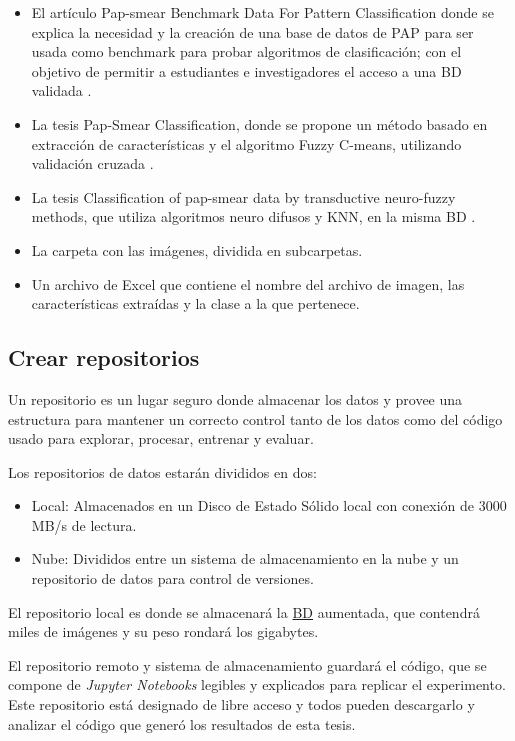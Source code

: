 \begin{itemize}
    \item El artículo Pap-smear Benchmark Data For Pattern Classification donde se explica
    la necesidad y la creación de una base de datos de PAP para ser usada como benchmark
    para probar algoritmos de clasificación; con el objetivo de permitir a estudiantes e investigadores
    el acceso a una BD validada \cite{Jantzen2005}.
    \item La tesis Pap-Smear Classification, donde se propone un método basado en extracción
    de características y el algoritmo Fuzzy C-means, utilizando validación cruzada \cite{Martin2003}.
    \item La tesis Classification of pap-smear data by transductive neuro-fuzzy
    methods, que utiliza algoritmos neuro difusos y KNN, en la misma BD  \cite{Norup2005}.
    \item La carpeta con las imágenes, dividida en subcarpetas.
    \item Un archivo de Excel que contiene el nombre del archivo de imagen, las características
    extraídas y la clase a la que pertenece.
\end{itemize}

\subsection{Crear repositorios}

Un repositorio es un lugar seguro donde almacenar los datos y provee una
estructura para mantener un correcto control tanto de los datos como del código
usado para explorar, procesar, entrenar y evaluar.

Los repositorios de datos estarán divididos en dos: 

\begin{itemize}
    \item{Local:} Almacenados en un Disco de Estado Sólido local con conexión de
    3000 MB/s de lectura.
    \item{Nube:} Divididos entre un sistema de almacenamiento en la nube y un repositorio
    de datos para control de versiones.
\end{itemize}

El repositorio local es donde se almacenará la \hyperlink{abbr}{BD} aumentada,
que contendrá miles de imágenes y su peso rondará los gigabytes.

El repositorio remoto y sistema de almacenamiento guardará el código, que se
compone de \emph{Jupyter Notebooks} legibles y explicados para replicar el
experimento. Este repositorio está designado de libre acceso y todos pueden
descargarlo y analizar el código que generó los resultados de esta tesis.

